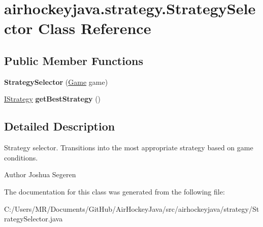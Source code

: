 \hypertarget{classairhockeyjava_1_1strategy_1_1_strategy_selector}{}\section{airhockeyjava.\+strategy.\+Strategy\+Selector Class Reference}
\label{classairhockeyjava_1_1strategy_1_1_strategy_selector}
\subsection*{Public Member Functions}
\begin{DoxyCompactItemize}
\item 
\hypertarget{classairhockeyjava_1_1strategy_1_1_strategy_selector_adc121fefd7a18bcdc83a68d5225a2c58}{}{\bfseries Strategy\+Selector} (\hyperlink{classairhockeyjava_1_1game_1_1_game}{Game} game)\label{classairhockeyjava_1_1strategy_1_1_strategy_selector_adc121fefd7a18bcdc83a68d5225a2c58}

\item 
\hypertarget{classairhockeyjava_1_1strategy_1_1_strategy_selector_a1f869a1951edcd17ee7bf6a774bcdb2e}{}\hyperlink{interfaceairhockeyjava_1_1strategy_1_1_i_strategy}{I\+Strategy} {\bfseries get\+Best\+Strategy} ()\label{classairhockeyjava_1_1strategy_1_1_strategy_selector_a1f869a1951edcd17ee7bf6a774bcdb2e}

\end{DoxyCompactItemize}


\subsection{Detailed Description}
Strategy selector. Transitions into the most appropriate strategy based on game conditions.

\begin{DoxyAuthor}{Author}
Joshua Segeren 
\end{DoxyAuthor}


The documentation for this class was generated from the following file\+:\begin{DoxyCompactItemize}
\item 
C\+:/\+Users/\+M\+R/\+Documents/\+Git\+Hub/\+Air\+Hockey\+Java/src/airhockeyjava/strategy/Strategy\+Selector.\+java\end{DoxyCompactItemize}
